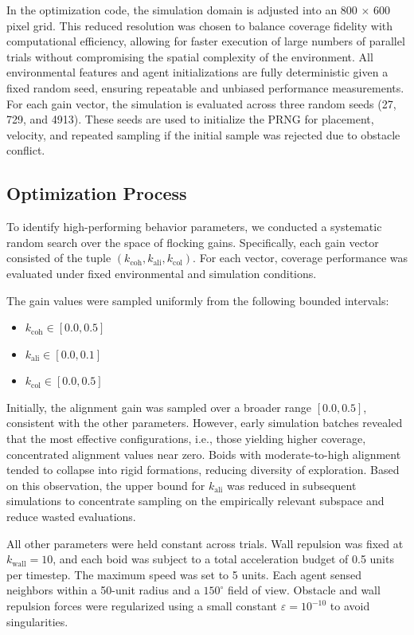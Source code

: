 \documentclass[12pt]{article}
\begin{document}
In the optimization code, the simulation domain is adjusted into an 800 \(\times\) 600 pixel grid. This reduced resolution was chosen to balance coverage fidelity with computational efficiency, allowing for faster execution of large numbers of parallel trials without compromising the spatial complexity of the environment. All environmental features and agent initializations are fully deterministic given a fixed random seed, ensuring repeatable and unbiased performance measurements. For each gain vector, the simulation is evaluated across three random seeds (27, 729, and 4913). These seeds are used to initialize the PRNG for placement, velocity, and repeated sampling if the initial sample was rejected due to obstacle conflict.

\subsection{Optimization Process}

To identify high-performing behavior parameters, we conducted a systematic random search over the space of flocking gains. Specifically, each gain vector consisted of the tuple \((k_\text{coh}, k_\text{ali}, k_\text{col})\). For each vector, coverage performance was evaluated under fixed environmental and simulation conditions.

The gain values were sampled uniformly from the following bounded intervals:
\begin{itemize}[nosep]
    \item \(k_\text{coh} \in [0.0, 0.5]\)
    \item \(k_\text{ali} \in [0.0, 0.1]\)
    \item \(k_\text{col} \in [0.0, 0.5]\)
\end{itemize}

Initially, the alignment gain was sampled over a broader range \([0.0, 0.5]\), consistent with the other parameters. However, early simulation batches revealed that the most effective configurations, i.e., those yielding higher coverage, concentrated alignment values near zero. Boids with moderate-to-high alignment tended to collapse into rigid formations, reducing diversity of exploration. Based on this observation, the upper bound for \(k_\text{ali}\) was reduced in subsequent simulations to concentrate sampling on the empirically relevant subspace and reduce wasted evaluations.

All other parameters were held constant across trials. Wall repulsion was fixed at \(k_\text{wall} = 10\), and each boid was subject to a total acceleration budget of 0.5 units per timestep. The maximum speed was set to 5 units. Each agent sensed neighbors within a 50-unit radius and a \(150^\circ\) field of view. Obstacle and wall repulsion forces were regularized using a small constant \(\varepsilon = 10^{-10}\) to avoid singularities.
\end{document}
